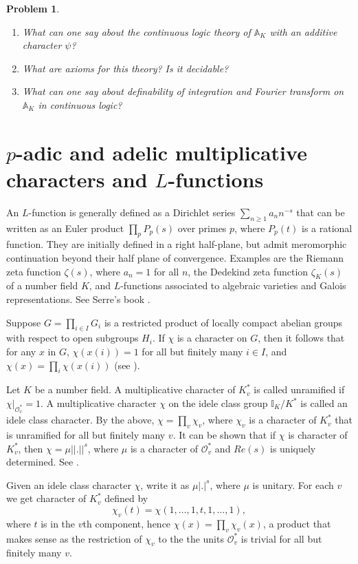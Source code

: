 \documentclass[12pt]{amsart}
\def\A{\mathbb{A}}
\def\I{\mathbb{I}}
\def\cM{\mathcal M}
\def\cO{\mathcal{O}}
\numberwithin{equation}{section}
\newtheorem{prob}{Problem}[section]
\begin{document}
\begin{prob}\noindent\begin{enumerate}
\item What can one say about the continuous logic theory of $\A_K$ with an additive character $\psi$?
\item What are axioms for this theory? Is it decidable? 
\item What can one say about definability of integration and Fourier transform on $\A_K$ in continuous logic?
\end{enumerate}
\end{prob}


\section{\bf $p$-adic and adelic multiplicative characters and $L$-functions }\label{ssec-char}


An $L$-function is generally defined as a Dirichlet series $\sum_{n\geq 1} a_n n^{-s}$ that can be written as an Euler product $\prod_{p} P_p(s)$ over primes $p$, where $P_p(t)$ is a rational function. They are initially defined in a right half-plane, but admit meromorphic continuation beyond their half plane of convergence. Examples are the Riemann zeta function $\zeta(s)$, where $a_n=1$ for all $n$, the Dedekind zeta function $\zeta_K(s)$ of a number field $K$, and $L$-functions associated to algebraic varieties 
and Galois representations. See Serre's book \cite{serre-book}.

Suppose $G=\prod_{i\in I} G_i$ is a restricted product of locally compact abelian groups with respect to open subgroups $H_i$. If $\chi$ is a character on $G$, then it follows that 
for any $x$ in $G$, $\chi(x(i))=1$ for all but finitely many $i\in I$, and $\chi(x)=\prod_i \chi(x(i))$ (see \cite{ramak}).

Let $K$ be a number field. A multiplicative character of $K_v^*$ is called unramified if $\chi\vert_{\cO_v^*}=1$. A multiplicative character $\chi$ on the idele class group $\I_K/K^*$ is called an idele class character. By the above, $\chi=\prod_v \chi_v$, where $\chi_v$ is a character of $K_v^*$ that is unramified for all but finitely many $v$. It can be shown that if $\chi$ is character of $K_v^*$, then 
$\chi=\mu ||.||^s$, where $\mu$ is a character of $\cO_v^{*}$ and $Re(s)$ is uniquely determined. See \cite{ramak}. 

Given an idele class character $\chi$, write it as $\mu |.|^s$, where $\mu$ is unitary. For each $v$ we get character of 
$K_v^*$ defined by 
$$\chi_v(t)=\chi(1,\dots,1,t,1,\dots,1),$$
where $t$ is in the $v$th component, hence 
$\chi(x)=\prod_v \chi_v(x)$, a product that makes sense as the restriction of $\chi_v$ to the the units $\cO_v^{*}$ is trivial for all but finitely many $v$. 
\end{document}

